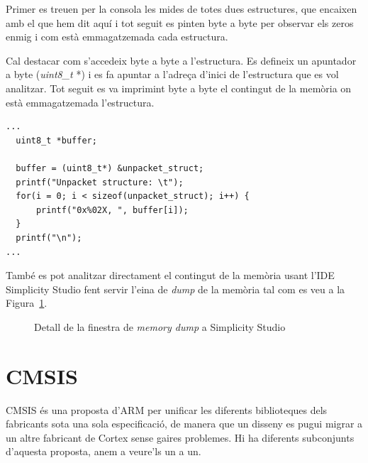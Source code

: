 Primer es treuen per la consola les mides de totes dues estructures, que encaixen amb el que hem dit aquí i tot seguit es pinten byte a byte per observar els zeros enmig i com està emmagatzemada cada estructura.

Cal destacar com s'accedeix byte a byte a l'estructura. Es defineix un apuntador a byte ({\em uint8\_t} *) i es fa apuntar a l'adreça d'inici de l'estructura que es vol analitzar. Tot seguit es va imprimint byte a byte el contingut de la memòria on està emmagatzemada l'estructura.

\begin{lstlisting}[style=customc,caption={Estructura d'exemple empaquetada},label=struct_example]
...
  uint8_t *buffer;

  buffer = (uint8_t*) &unpacket_struct;
  printf("Unpacket structure: \t");
  for(i = 0; i < sizeof(unpacket_struct); i++) {
	  printf("0x%02X, ", buffer[i]);
  }
  printf("\n");
...
\end{lstlisting}


També es pot analitzar directament el contingut de la memòria usant l'IDE Simplicity Studio fent servir l'eina de {\em dump} de la memòria tal com es veu a la Figura~\ref{fig:UnpackedMemoryStructure}.

\begin{figure}
 \centering
 \caption{Detall de la finestra de {\em memory dump} a Simplicity Studio}
 \label{fig:UnpackedMemoryStructure}
\end{figure}


\chapter{CMSIS}
\label{ch:CMSIS}
\gls{CMSIS} és una proposta d'ARM per unificar les diferents biblioteques dels fabricants sota una sola especificació, de manera que un disseny es pugui migrar a un altre fabricant de Cortex sense gaires problemes. Hi ha diferents subconjunts d'aquesta proposta, anem a veure'ls un a un.

